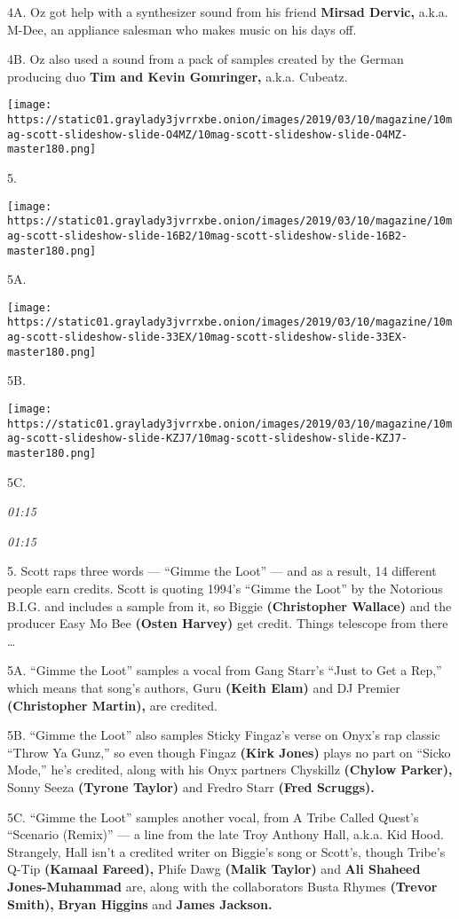 4A. Oz got help with a synthesizer sound from his friend \textbf{Mirsad
Dervic,} a.k.a. M-Dee, an appliance salesman who makes music on his days
off.

4B. Oz also used a sound from a pack of samples created by the German
producing duo \textbf{Tim and Kevin Gomringer,} a.k.a. Cubeatz.

\texttt{[image: https://static01.graylady3jvrrxbe.onion/images/2019/03/10/magazine/10mag-scott-slideshow-slide-O4MZ/10mag-scott-slideshow-slide-O4MZ-master180.png]}

5.

\texttt{[image: https://static01.graylady3jvrrxbe.onion/images/2019/03/10/magazine/10mag-scott-slideshow-slide-16B2/10mag-scott-slideshow-slide-16B2-master180.png]}

5A.

\texttt{[image: https://static01.graylady3jvrrxbe.onion/images/2019/03/10/magazine/10mag-scott-slideshow-slide-33EX/10mag-scott-slideshow-slide-33EX-master180.png]}

5B.

\texttt{[image: https://static01.graylady3jvrrxbe.onion/images/2019/03/10/magazine/10mag-scott-slideshow-slide-KZJ7/10mag-scott-slideshow-slide-KZJ7-master180.png]}

5C.

\emph{01:15}

\emph{01:15}

5. Scott raps three words --- ``Gimme the Loot'' --- and as a result, 14
different people earn credits. Scott is quoting 1994's ``Gimme the
Loot'' by the Notorious B.I.G. and includes a sample from it, so Biggie
\textbf{(Christopher Wallace)} and the producer Easy Mo Bee
\textbf{(Osten Harvey)} get credit. Things telescope from there \ldots{}

5A. ``Gimme the Loot'' samples a vocal from Gang Starr's ``Just to Get a
Rep,'' which means that song's authors, Guru \textbf{(Keith Elam)} and
DJ Premier \textbf{(Christopher Martin),} are credited.

5B. ``Gimme the Loot'' also samples Sticky Fingaz's verse on Onyx's rap
classic ``Throw Ya Gunz,'' so even though Fingaz \textbf{(Kirk Jones)}
plays no part on ``Sicko Mode,'' he's credited, along with his Onyx
partners Chyskillz \textbf{(Chylow Parker),} Sonny Seeza \textbf{(Tyrone
Taylor)} and Fredro Starr \textbf{(Fred Scruggs).}

5C. ``Gimme the Loot'' samples another vocal, from A Tribe Called
Quest's ``Scenario (Remix)'' --- a line from the late Troy Anthony Hall,
a.k.a. Kid Hood. Strangely, Hall isn't a credited writer on Biggie's
song or Scott's, though Tribe's Q-Tip \textbf{(Kamaal Fareed),} Phife
Dawg \textbf{(Malik Taylor)} and \textbf{Ali Shaheed Jones-Muhammad}
are, along with the collaborators Busta Rhymes \textbf{(Trevor Smith),}
\textbf{Bryan Higgins} and \textbf{James Jackson.}


